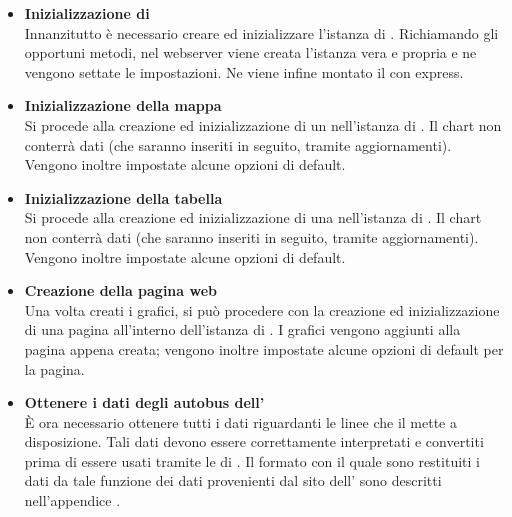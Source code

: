         \begin{itemize}

            \item \textbf{Inizializzazione di } \\
            Innanzitutto è necessario creare ed inizializzare l'istanza di . Richiamando gli opportuni metodi, nel webserver viene creata l'istanza vera e propria e ne vengono settate le impostazioni. Ne viene infine montato il  con express.
            
            \item \textbf{Inizializzazione della mappa} \\
            Si procede alla creazione ed inizializzazione di un  nell'istanza di . Il chart non conterrà dati (che saranno inseriti in seguito, tramite aggiornamenti). Vengono inoltre impostate alcune opzioni di default. 
            
                        
            \item \textbf{Inizializzazione della tabella} \\
            Si procede alla creazione ed inizializzazione di una  nell'istanza di . Il chart non conterrà dati (che saranno inseriti in seguito, tramite aggiornamenti). Vengono inoltre impostate alcune opzioni di default.
            
            \item \textbf{Creazione della pagina web} \\
            Una volta creati i grafici, si può procedere con la creazione ed inizializzazione di una pagina all'interno dell'istanza di . I grafici vengono aggiunti alla pagina appena creata; vengono inoltre impostate alcune opzioni di default per la pagina.
            
            \item \textbf{Ottenere i dati degli autobus dell'} \\
            È ora necessario ottenere tutti i dati riguardanti le linee che il   mette a disposizione. Tali dati devono essere correttamente interpretati e convertiti prima di essere usati tramite le  di . Il formato con il quale sono restituiti i dati da tale funzione dei dati provenienti dal sito dell' sono descritti nell'appendice .
            

\end{itemize}
